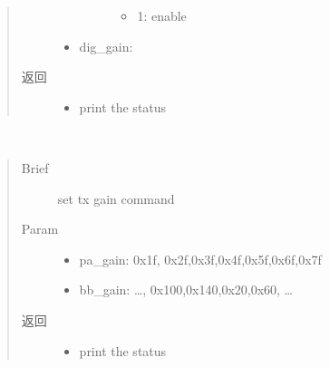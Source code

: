 \documentclass[letterpaper,10pt,english]{sphinxhowto}
\begin{document}
\begin{fulllineitems}
\begin{fulllineitems}
\begin{quote}
\begin{description}
\begin{itemize}
\begin{description}
\begin{itemize}
\item {} 
1: enable

\end{itemize}

\end{description}

\item {} 
dig\_gain:

\end{itemize}

\item[{返回}] \leavevmode
\begin{itemize}
\item {} 
print the status

\end{itemize}


\end{description}\end{quote}

\end{fulllineitems}


\begin{fulllineitems}
\label{\detokenize{rfapi/index:wifi_api.WIFIAPI.set_tx_gain}}~\begin{quote}\begin{description}
\item[{Brief}] \leavevmode
set tx gain command

\item[{Param}] \leavevmode\begin{itemize}
\item {} 
pa\_gain: 0x1f, 0x2f,0x3f,0x4f,0x5f,0x6f,0x7f

\item {} 
bb\_gain: …, 0x100,0x140,0x20,0x60, …

\end{itemize}

\item[{返回}] \leavevmode
\begin{itemize}
\item {} 
print the status

\end{itemize}


\end{description}\end{quote}


\end{fulllineitems}
\end{fulllineitems}
\end{document}
